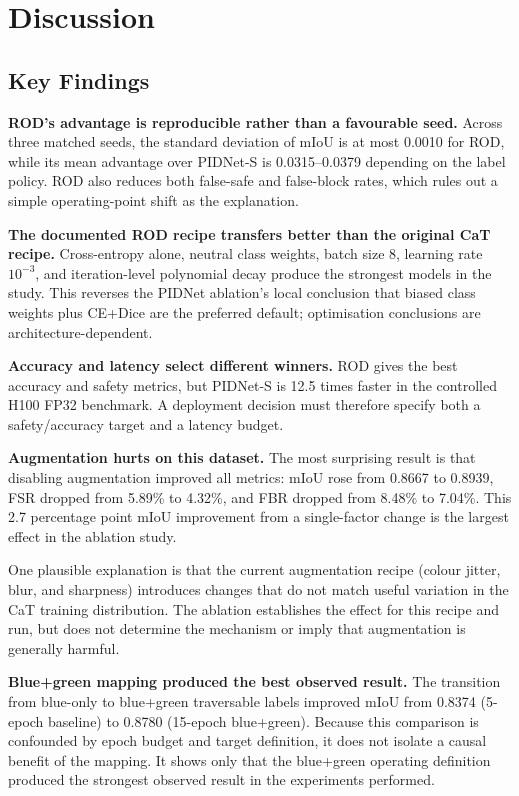 \documentclass[12pt,a4paper]{report}
\begin{document}
\chapter{Discussion}
\label{sec:discussion}

\section{Key Findings}

\textbf{ROD's advantage is reproducible rather than a favourable seed.}
Across three matched seeds, the standard deviation of mIoU is at most 0.0010
for ROD, while its mean advantage over PIDNet-S is 0.0315--0.0379 depending on
the label policy. ROD also reduces both false-safe and false-block rates, which
rules out a simple operating-point shift as the explanation.

\textbf{The documented ROD recipe transfers better than the original CaT recipe.}
Cross-entropy alone, neutral class weights, batch size 8, learning rate
$10^{-3}$, and iteration-level polynomial decay produce the strongest models
in the study. This reverses the PIDNet ablation's local conclusion that biased
class weights plus CE+Dice are the preferred default; optimisation conclusions
are architecture-dependent.

\textbf{Accuracy and latency select different winners.}
ROD gives the best accuracy and safety metrics, but PIDNet-S is 12.5 times
faster in the controlled H100 FP32 benchmark. A deployment decision must
therefore specify both a safety/accuracy target and a latency budget.

\textbf{Augmentation hurts on this dataset.}
The most surprising result is that disabling augmentation improved all metrics: mIoU rose from 0.8667 to 0.8939, FSR dropped from 5.89\% to 4.32\%, and FBR dropped from 8.48\% to 7.04\%.
This 2.7 percentage point mIoU improvement from a single-factor change is the largest effect in the ablation study.

One plausible explanation is that the current augmentation recipe (colour
jitter, blur, and sharpness) introduces changes that do not match useful
variation in the CaT training distribution. The ablation establishes the
effect for this recipe and run, but does not determine the mechanism or imply
that augmentation is generally harmful.

\textbf{Blue+green mapping produced the best observed result.}
The transition from blue-only to blue+green traversable labels improved mIoU from 0.8374 (5-epoch baseline) to 0.8780 (15-epoch blue+green).
Because this comparison is confounded by epoch budget and target definition,
it does not isolate a causal benefit of the mapping. It shows only that the
blue+green operating definition produced the strongest observed result in the
experiments performed.
\end{document}
